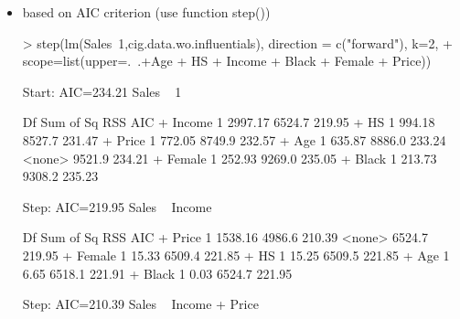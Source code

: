 \documentclass[a4paper]{article}
\begin{document}
\begin{itemize}
\begin{itemize}
\begin{Schunk}
\begin{Soutput}
[1] 0.4900867
\end{Soutput}
\end{Schunk}
Adjusted R-squared increased and all predictors are significant. 
But checking what happens when we remove one more predictor which is on the
limit of significance i.e. Female (0.049)
\begin{Schunk}
\begin{Sinput}
> wo.female.sum<-summary(update(cig.lm.wo.influentials,.~. - Age-HS-Black-Female))
> wo.female.sum$coef[,4, drop=F]
\end{Sinput}
\begin{Soutput}
                Pr(>|t|)
(Intercept) 9.591939e-07
Income      2.424749e-06
Price       1.116641e-03
\end{Soutput}
\begin{Sinput}
> wo.female.sum$adj.r.squared
\end{Sinput}
\begin{Soutput}
[1] 0.4501189
\end{Soutput}
\end{Schunk}
Now Adjusted R-Squared decreased.
The model achieved using backward elimination is 
Sales $\sim$ Income+Female+Price with Adjusted R-Squared 0.49.
\item based on AIC criterion (use function step())
\begin{Schunk}
\begin{Sinput}
> step(lm(Sales~1,cig.data.wo.influentials), direction = c("forward"), k=2, 
+ 		scope=list(upper=.~.+Age + HS + Income + Black + Female + Price))	
\end{Sinput}
\begin{Soutput}
Start:  AIC=234.21
Sales ~ 1

         Df Sum of Sq    RSS    AIC
+ Income  1   2997.17 6524.7 219.95
+ HS      1    994.18 8527.7 231.47
+ Price   1    772.05 8749.9 232.57
+ Age     1    635.87 8886.0 233.24
<none>                9521.9 234.21
+ Female  1    252.93 9269.0 235.05
+ Black   1    213.73 9308.2 235.23

Step:  AIC=219.95
Sales ~ Income

         Df Sum of Sq    RSS    AIC
+ Price   1   1538.16 4986.6 210.39
<none>                6524.7 219.95
+ Female  1     15.33 6509.4 221.85
+ HS      1     15.25 6509.5 221.85
+ Age     1      6.65 6518.1 221.91
+ Black   1      0.03 6524.7 221.95

Step:  AIC=210.39
Sales ~ Income + Price


\end{Soutput}
\end{Schunk}
\end{itemize}
\end{itemize}
\end{document}
